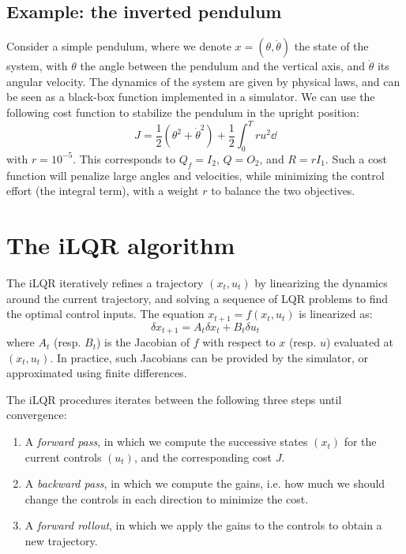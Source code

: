 \documentclass[nodate]{../cs-classes/cs-classes}
\begin{document}
\subsection{Example: the inverted pendulum}
Consider a simple pendulum, where we denote $x = (\theta, \dot{\theta})$ the state of the system, with $\theta$ the angle between the pendulum and the vertical axis, and $\dot{\theta}$ its angular velocity. The dynamics of the system are given by physical laws, and can be seen as a black-box function implemented in a simulator. We can use the following cost function to stabilize the pendulum in the upright position:
\begin{equation*}
    J = \frac{1}{2}\left(\theta^2+\dot{\theta}^2\right) + \frac{1}{2}\int_0^T ru^2 \dd
\end{equation*}
with $r=10^{-5}$. This corresponds to $Q_f = I_2$, $Q=O_2$, and $R=rI_1$. Such a cost function will penalize large angles and velocities, while minimizing the control effort (the integral term), with a weight $r$ to balance the two objectives.

\section{The iLQR algorithm}
The iLQR iteratively refines a trajectory $(x_t, u_t)$ by linearizing the dynamics around the current trajectory, and solving a sequence of LQR problems to find the optimal control inputs. The equation $x_{t+1} = f(x_t, u_t)$ is linearized as:
\begin{equation*}
    \delta x_{t+1} = A_t \delta x_t + B_t \delta u_t
\end{equation*}
where $A_t$ (resp. $B_t$) is the Jacobian of $f$ with respect to $x$ (resp. $u$) evaluated at $(x_t, u_t)$. In practice, such Jacobians can be provided by the simulator, or approximated using finite differences.

The iLQR procedures iterates between the following three steps until convergence:
\begin{enumerate}
    \item A \emph{forward pass}, in which we compute the successive states $(x_t)$ for the current controls $(u_t)$, and the corresponding cost $J$.
    \item A \emph{backward pass}, in which we compute the gains, i.e. how much we should change the controls in each direction to minimize the cost.
    \item A \emph{forward rollout}, in which we apply the gains to the controls to obtain a new trajectory.
\end{enumerate}
\end{document}
